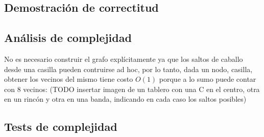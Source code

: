 \subsection{Demostración de correctitud}



\subsection{Análisis de complejidad}
No es necesario construir el grafo explícitamente ya que los saltos de caballo desde una casilla pueden contruirse 
ad hoc, por lo tanto, dada un nodo, casilla, obtener los vecinos del mismo tiene costo $O(1)$ porque a lo sumo
puede contar con 8 vecinos:
(TODO insertar imagen de un tablero con una C en el centro, otra en un rincón y otra en una banda, indicando en cada
caso los saltos posibles)

\subsection{Tests de complejidad}
